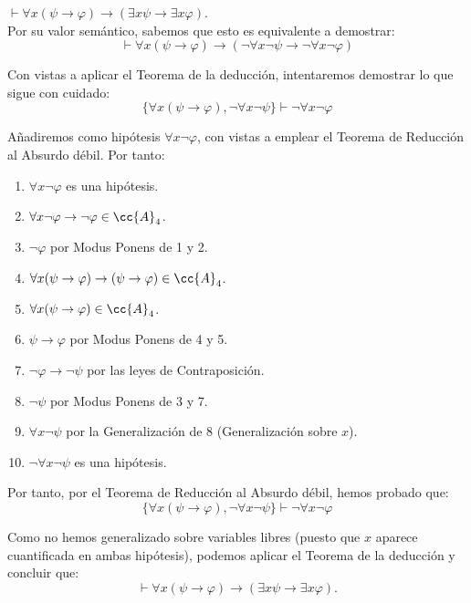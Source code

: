 \begin{ejercicio}\label{ej:2.8}
    $\vdash \forall x(\psi \rightarrow \varphi) \rightarrow (\exists x \psi \rightarrow \exists x \varphi)$.\\

    Por su valor semántico, sabemos que esto es equivalente a demostrar:
    \begin{equation*}
        \vdash \forall x(\psi \rightarrow \varphi) \rightarrow (\neg\forall x\neg \psi \rightarrow \neg\forall x\neg \varphi)
    \end{equation*}

    Con vistas a aplicar el Teorema de la deducción, intentaremos demostrar lo que sigue con cuidado:
    \begin{equation*}
        \{\forall x(\psi \rightarrow \varphi), \neg\forall x\neg \psi \}\vdash \neg\forall x\neg \varphi
    \end{equation*}

    Añadiremos como hipótesis $\forall x\neg \varphi$, con vistas a emplear el Teorema de Reducción al Absurdo débil. Por tanto:
    \begin{enumerate}
        \item $\forall x\neg \varphi$ es una hipótesis.
        \item $\forall x\neg\varphi \rightarrow \neg\varphi\in \cc{A}_4$.
        \item $\neg\varphi$ por Modus Ponens de 1 y 2.
        \item $\forall x(\psi \rightarrow \varphi)\rightarrow (\psi \rightarrow \varphi)\in \cc{A}_4$.
        \item $\forall x(\psi \rightarrow \varphi)\in \cc{A}_4$.
        \item $\psi \rightarrow \varphi$ por Modus Ponens de 4 y 5.
        \item $\neg \varphi \rightarrow \neg \psi$ por las leyes de Contraposición.
        \item $\neg \psi$ por Modus Ponens de 3 y 7.
        \item $\forall x\neg \psi$ por la Generalización de $8$ \qquad (Generalización sobre $x$).
        \item $\neg\forall x\neg \psi$ es una hipótesis.
    \end{enumerate}

    Por tanto, por el Teorema de Reducción al Absurdo débil, hemos probado que:
    \begin{equation*}
        \{\forall x(\psi \rightarrow \varphi), \neg\forall x\neg \psi \}\vdash \neg\forall x\neg \varphi
    \end{equation*}

    Como no hemos generalizado sobre variables libres (puesto que $x$ aparece cuantificada en ambas hipótesis), podemos aplicar el Teorema de la deducción y concluir que:
    \begin{equation*}
        \vdash \forall x(\psi \rightarrow \varphi) \rightarrow (\exists x \psi \rightarrow \exists x \varphi).
    \end{equation*}
    
\end{ejercicio}

